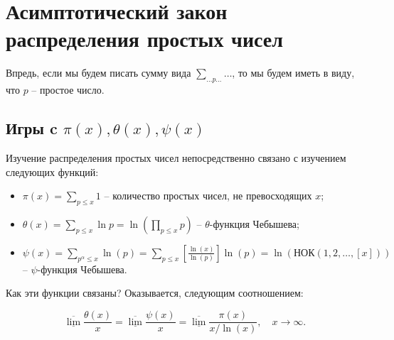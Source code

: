 \section{Асимптотический закон распределения простых чисел}
\begin{note}
	Впредь, если мы будем писать сумму вида $\displaystyle \sum_{ \ldots p \ldots} \ldots$, то мы будем иметь в виду, что $p$ -- простое число.
\end{note}

\subsection{Игры c $\pi(x), \theta(x), \psi(x)$}
Изучение распределения простых чисел непосредственно связано с изучением следующих функций:
\begin{itemize}
   \item $\displaystyle \pi(x) = \sum_{p \leq x} 1$ -- количество простых чисел, не превосходящих $x$;
   \item $\displaystyle \theta(x) = \sum_{p \leq x} \ln p = \ln \left(\prod_{p \leq x} p\right)$ -- $\theta$-функция Чебышева;
   \item $\displaystyle \psi(x) = \sum_{p^{\alpha} \leq x} \ln(p) = \sum_{p \leq x} \left[\frac{\ln(x)}{\ln(p)}\right] \ln(p) = \ln \left( \text{НОК}(1, 2, \ldots, [x]) \right)$ -- $\psi$-функция Чебышева.
\end{itemize}
Как эти функции связаны? Оказывается, следующим соотношением:
\begin{lemma} \label{l1_lm1}
	$$\underline{\overline{\lim}} \frac{\theta(x)}{x} = \underline{\overline{\lim}} \frac{\psi(x)}{x} = \underline{\overline{\lim}} \frac{\pi(x)}{x / \ln(x)}, \quad x \to \infty.$$
\end{lemma}
